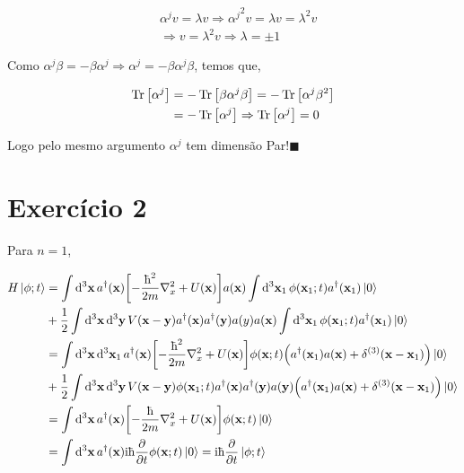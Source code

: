 \documentclass[twoside]{amsart}
\newcommand{\cqd}{\hfill$\blacksquare$}
\numberwithin{equation}{section}
\begin{document}
\begin{align*}
    &\alpha^j v = \lambda v\Rightarrow {\alpha^j}^2 v=\lambda v= \lambda^2 v\\
    &\Rightarrow v=\lambda^2 v\Rightarrow \lambda =\pm 1
\end{align*}

Como $\alpha^j\beta=-\beta\alpha ^j\Rightarrow \alpha^j=-\beta\alpha^j\beta$, temos que,

\begin{align*}
    \Tr\qty[\alpha^j]&=-\Tr\qty[\beta\alpha^j\beta]=-\Tr\qty[\alpha^j\beta^2]\\
    &=-\Tr\qty[\alpha^j]\Rightarrow\Tr\qty[\alpha^j]=0
\end{align*}

Logo pelo mesmo argumento $\alpha^j$ tem dimensão Par!\cqd


\section{Exercício 2}

Para $n=1$,

\begin{align*}
    H\ket{\phi; t}&=\int\dd[3]{\vb x} a^\dagger\qty(\vb x)\qty[-\frac{\hbar^2}{2m}\laplacian_x+U\qty(\vb x)]a\qty(\vb x)\int\dd[3]{\vb x_1}\phi\qty(\vb x_1;t)a^\dagger\qty(\vb x_1)\ket 0\\
    &+\frac12\int\dd[3]{\vb x}\dd[3]{\vb y}V\qty(\vb x-\vb y)a^\dagger\qty(\vb x)a^\dagger\qty(\vb y)a\qty(y)a\qty(\vb x)\int\dd[3]{\vb x_1}\phi\qty(\vb x_1;t)a^\dagger\qty(\vb x_1)\ket 0\\
    &=\int\dd[3]{\vb x}\dd[3]{\vb x_1}a^\dagger\qty(\vb x)\qty[-\frac{\hbar^2}{2m}\laplacian_x+U\qty(\vb x)]\phi\qty(\vb x; t)\qty(a^\dagger\qty(\vb x_1)a\qty(\vb x)+\delta^{\qty(3)}\qty(\vb x-\vb x_1))\ket 0\\
    &+\frac12\int\dd[3]{\vb x}\dd[3]{\vb y}V\qty(\vb x-\vb y)\phi\qty(\vb x_1;t)a^\dagger\qty(\vb x)a^\dagger\qty(\vb y)a\qty(\vb y)\qty(a^\dagger\qty(\vb x_1)a\qty(\vb x)+\delta^{\qty(3)}\qty(\vb x-\vb x_1))\ket 0\\
    &=\int\dd[3]{\vb x}a^\dagger\qty(\vb x)\qty[-\frac{\hbar}{2m}\laplacian_x+U\qty(\vb x)]\phi\qty(\vb x;t)\ket 0\\
    &=\int\dd[3]{\vb x}a^\dagger\qty(\vb x)\im \hbar\pdv{}{t}\phi\qty(\vb x;t)\ket 0=\im\hbar\pdv{}{t}\ket{\phi;t}
\end{align*}
\end{document}
